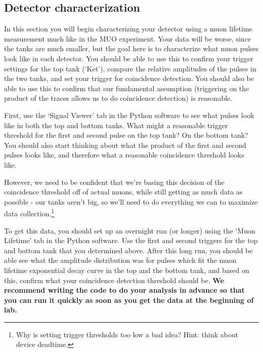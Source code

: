 \documentclass{../lab}
\begin{document}
\subsection{Detector characterization}
\label{sec:characterization}
In this section you will begin characterizing your detector using a muon lifetime measurement much like in the MUO experiment. Your data will be worse, since the tanks are much smaller, but the goal here is to characterize what muon pulses look like in each detector. You should be able to use this to confirm your trigger settings for the top tank (`Ket'), compare the relative amplitudes of the pulses in the two tanks, and set your trigger for coincidence detection. You should also be able to use this to confirm that our fundamental assumption (triggering on the product of the traces allows us to do coincidence detection) is reasonable. 

First, use the `Signal Viewer' tab in the Python software to see what pulses look like in both the top and bottom tanks. What might a reasonable trigger threshold for the first and second pulse on the top tank? On the bottom tank? You should also start thinking about what the product of the first and second pulses looks like, and therefore what a reasonable coincidence threshold looks like. 


However, we need to be confident that we're basing this decision of the coincidence threshold off of actual muons, while still getting as much data as possible - our tanks aren't big, so we'll need to do everything we can to maximize data collection.\footnote{Why is setting trigger thresholds too low a bad idea? Hint: think about device deadtime.}

To get this data, you should set up an overnight run (or longer) using the `Muon Lifetime' tab in the Python software. Use the first and second triggers for the top and bottom tank that you determined above. After this long run, you should be able see what the amplitude distribution was for pulses which fit the muon lifetime exponential decay curve in the top and the bottom tank, and based on this, confirm what your coincidence detection threshold should be. \textbf{We recommend writing the code to do your analysis in advance so that you can run it quickly as soon as you get the data at the beginning of lab.}
\end{document}

